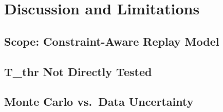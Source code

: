 
\section{Discussion and Limitations}
\label{sec:discussion}

\subsection{Scope: Constraint-Aware Replay Model}

\subsection{T\_thr Not Directly Tested}

\subsection{Monte Carlo vs.\ Data Uncertainty}

